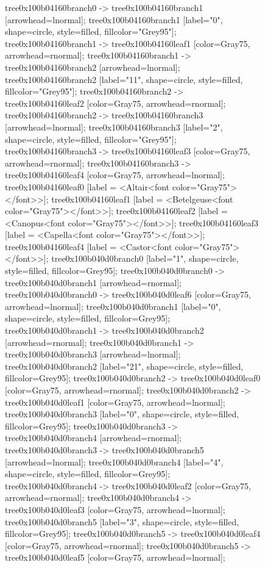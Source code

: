\documentclass[12pt]{article}
\begin{document}
\begin{figure}
{{	tree0x100b04160branch0 -> tree0x100b04160branch1 [arrowhead=lnormal];
	tree0x100b04160branch1 [label="0", shape=circle, style=filled, fillcolor="Grey95"];
	tree0x100b04160branch1 -> tree0x100b04160leaf1 [color=Gray75, arrowhead=rnormal];
	tree0x100b04160branch1 -> tree0x100b04160branch2 [arrowhead=lnormal];
	tree0x100b04160branch2 [label="11", shape=circle, style=filled, fillcolor="Grey95"];
	tree0x100b04160branch2 -> tree0x100b04160leaf2 [color=Gray75, arrowhead=rnormal];
	tree0x100b04160branch2 -> tree0x100b04160branch3 [arrowhead=lnormal];
	tree0x100b04160branch3 [label="2", shape=circle, style=filled, fillcolor="Grey95"];
	tree0x100b04160branch3 -> tree0x100b04160leaf3 [color=Gray75, arrowhead=rnormal];
	tree0x100b04160branch3 -> tree0x100b04160leaf4 [color=Gray75, arrowhead=lnormal];
	tree0x100b04160leaf0 [label = <Altair<font color="Gray75"></font>>];
	tree0x100b04160leaf1 [label = <Betelgeuse<font color="Gray75"></font>>];
	tree0x100b04160leaf2 [label = <Canopus<font color="Gray75"></font>>];
	tree0x100b04160leaf3 [label = <Capella<font color="Gray75"></font>>];
	tree0x100b04160leaf4 [label = <Castor<font color="Gray75"></font>>];
	tree0x100b040d0branch0 [label="1", shape=circle, style=filled, fillcolor=Grey95];
	tree0x100b040d0branch0 -> tree0x100b040d0branch1 [arrowhead=rnormal];
	tree0x100b040d0branch0 -> tree0x100b040d0leaf6 [color=Gray75, arrowhead=lnormal];
	tree0x100b040d0branch1 [label="0", shape=circle, style=filled, fillcolor=Grey95];
	tree0x100b040d0branch1 -> tree0x100b040d0branch2 [arrowhead=rnormal];
	tree0x100b040d0branch1 -> tree0x100b040d0branch3 [arrowhead=lnormal];
	tree0x100b040d0branch2 [label="21", shape=circle, style=filled, fillcolor=Grey95];
	tree0x100b040d0branch2 -> tree0x100b040d0leaf0 [color=Gray75, arrowhead=rnormal];
	tree0x100b040d0branch2 -> tree0x100b040d0leaf1 [color=Gray75, arrowhead=lnormal];
	tree0x100b040d0branch3 [label="0", shape=circle, style=filled, fillcolor=Grey95];
	tree0x100b040d0branch3 -> tree0x100b040d0branch4 [arrowhead=rnormal];
	tree0x100b040d0branch3 -> tree0x100b040d0branch5 [arrowhead=lnormal];
	tree0x100b040d0branch4 [label="4", shape=circle, style=filled, fillcolor=Grey95];
	tree0x100b040d0branch4 -> tree0x100b040d0leaf2 [color=Gray75, arrowhead=rnormal];
	tree0x100b040d0branch4 -> tree0x100b040d0leaf3 [color=Gray75, arrowhead=lnormal];
	tree0x100b040d0branch5 [label="3", shape=circle, style=filled, fillcolor=Grey95];
	tree0x100b040d0branch5 -> tree0x100b040d0leaf4 [color=Gray75, arrowhead=rnormal];
	tree0x100b040d0branch5 -> tree0x100b040d0leaf5 [color=Gray75, arrowhead=lnormal];
}}
\end{figure}
\end{document}
